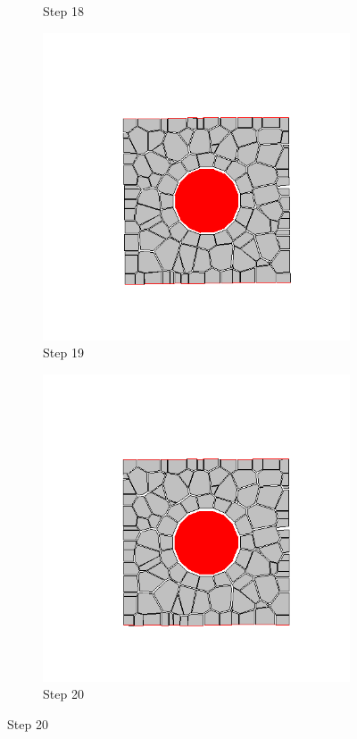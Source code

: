 \begin{figure}[ht!]
\begin{subfigure}{.25\textwidth}
      \caption{Step 18}
      \end{subfigure}%
      \begin{subfigure}{.25\textwidth}
        \centering
        \includegraphics[width=1.0\linewidth]{Files/Small_DEF/CR/DEP5-STEP(019).png}
      \caption{Step 19}
      \end{subfigure}%
      \begin{subfigure}{.25\textwidth}
        \centering
        \includegraphics[width=1.0\linewidth]{Files/Small_DEF/CR/DEP5-STEP(020).png}
      \caption{Step 20}
      \end{subfigure}


\end{figure}
